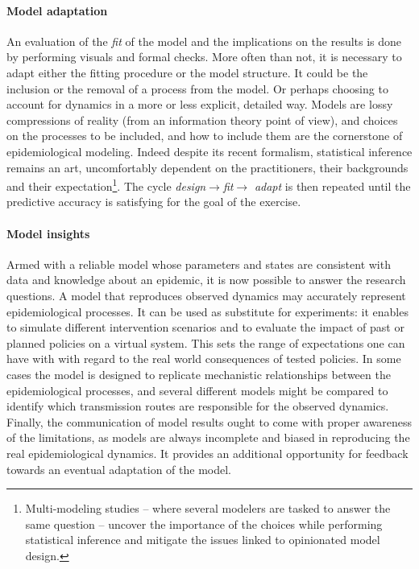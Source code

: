 \paragraph{Model adaptation} An evaluation of the \textit{fit} of the model and the implications on the results is done by performing visuals and formal checks. More often than not, it is necessary to adapt either the fitting procedure or the model structure. It could be the inclusion or the removal of a process from the model. Or perhaps choosing to account for dynamics in a more or less explicit, detailed way. Models are lossy compressions of reality (from an information theory point of view), and choices on the processes to be included, and how to include them are the cornerstone of epidemiological modeling. Indeed despite its recent formalism, statistical inference remains an art, uncomfortably dependent on the practitioners, their backgrounds and their expectation\footnote{Multi-modeling studies -- where several modelers are tasked to answer the same question -- uncover the importance of the choices while performing statistical inference and mitigate the issues linked to opinionated model design.}. The cycle \textit{design}$\rightarrow$\textit{fit}$\rightarrow$ \textit{adapt} is then repeated until the predictive accuracy is satisfying for the goal of the exercise. 

\paragraph{Model insights}  Armed with a reliable model whose parameters and states are consistent with data and knowledge about an epidemic, it is now possible to answer the research questions. A model that reproduces observed dynamics may accurately represent epidemiological processes. It can be used as substitute for experiments: it enables to simulate different intervention scenarios and to evaluate the impact of past or planned policies on a virtual system. This sets the range of expectations one can have with with regard to the real world consequences of tested policies. In some cases the model is designed to replicate mechanistic relationships between the epidemiological processes, and several different models might be compared to identify which transmission routes are responsible for the observed dynamics.  Finally, the communication of model results ought to come with proper awareness of the limitations, as models are always incomplete and biased in reproducing the real epidemiological dynamics. It provides an additional opportunity for feedback towards an eventual adaptation of the model\cite{Heesterbeek:ModelingInfectiousDisease:2015}. 

